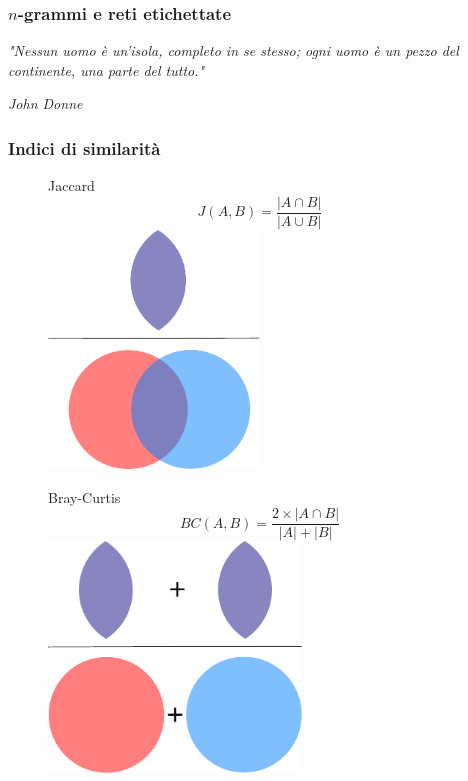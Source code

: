 \begin{frame}
	\frametitle{$n$-grammi e reti etichettate}
	
	\textit{"Nessun uomo è un'isola, completo in se stesso; ogni uomo è un pezzo del continente, una parte del tutto."}
	\begin{flushright}
		\small \textit{John Donne}
	\end{flushright}
	
	
\end{frame}

\begin{frame}
	\frametitle{Indici di similarità}
	\centering
	
	\small
	
	\begin{figure}[h]
		\begin{minipage}[t]{.48\textwidth}
			\centering
			\Large
			Jaccard
			\small
			\medskip
			\begin{equation*}
				J(A,B) = \frac{|A \cap B|}{|A \cup B|}
			\end{equation*}
			\includegraphics[width=0.5\textwidth]{images/4_jaccard}
		\end{minipage}\hfill
		\begin{minipage}[t]{.48\textwidth}
			\centering
			\Large
			Bray-Curtis
			\small
			\medskip
			\begin{equation*}
			BC(A,B) = \frac{2 \times |A \cap B|}{|A| + |B|}
			\end{equation*}
			\includegraphics[width=0.6\textwidth]{images/5_bray_curtis}
			

\end{minipage}
\end{figure}
\end{frame}
